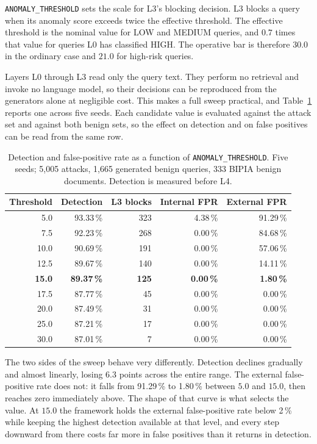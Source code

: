 \texttt{ANOMALY\_THRESHOLD} sets the scale for L3's blocking decision. L3 blocks a query when its anomaly score exceeds twice the effective threshold. The effective threshold is the nominal value for LOW and MEDIUM queries, and $0.7$ times that value for queries L0 has classified HIGH. The operative bar is therefore $30.0$ in the ordinary case and $21.0$ for high-risk queries.

Layers L0 through L3 read only the query text. They perform no retrieval and invoke no language model, so their decisions can be reproduced from the generators alone at negligible cost. This makes a full sweep practical, and Table~\ref{tab:l3_sweep} reports one across five seeds. Each candidate value is evaluated against the attack set and against both benign sets, so the effect on detection and on false positives can be read from the same row.

\begin{table}[h]
\centering
\caption{Detection and false-positive rate as a function of \texttt{ANOMALY\_THRESHOLD}. Five seeds; 5{,}005 attacks, 1{,}665 generated benign queries, 333 BIPIA benign documents. Detection is measured before L4.}
\label{tab:l3_sweep}
\begin{tabular}{rrrrr}
\toprule
\textbf{Threshold} & \textbf{Detection} & \textbf{L3 blocks} & \textbf{Internal FPR} & \textbf{External FPR} \\
\midrule
 5.0 & 93.33\,\% & 323 & 4.38\,\% & 91.29\,\% \\
 7.5 & 92.23\,\% & 268 & 0.00\,\% & 84.68\,\% \\
10.0 & 90.69\,\% & 191 & 0.00\,\% & 57.06\,\% \\
12.5 & 89.67\,\% & 140 & 0.00\,\% & 14.11\,\% \\
\textbf{15.0} & \textbf{89.37\,\%} & \textbf{125} & \textbf{0.00\,\%} & \textbf{1.80\,\%} \\
17.5 & 87.77\,\% &  45 & 0.00\,\% & 0.00\,\% \\
20.0 & 87.49\,\% &  31 & 0.00\,\% & 0.00\,\% \\
25.0 & 87.21\,\% &  17 & 0.00\,\% & 0.00\,\% \\
30.0 & 87.01\,\% &   7 & 0.00\,\% & 0.00\,\% \\
\bottomrule
\end{tabular}
\end{table}

The two sides of the sweep behave very differently. Detection declines gradually and almost linearly, losing 6.3 points across the entire range. The external false-positive rate does not: it falls from 91.29\,\% to 1.80\,\% between $5.0$ and $15.0$, then reaches zero immediately above. The shape of that curve is what selects the value. At $15.0$ the framework holds the external false-positive rate below 2\,\% while keeping the highest detection available at that level, and every step downward from there costs far more in false positives than it returns in detection.

